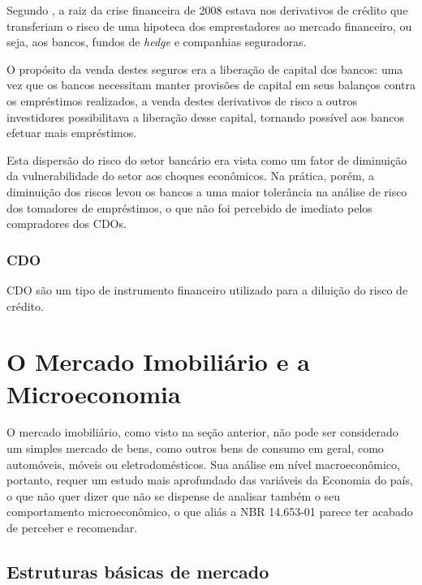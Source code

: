 \documentclass[
	12pt,				%
	oneside,			%
	a4paper,			%
	chapter=TITLE,		%
	section=TITLE,		%
	english,			%
	brazil				%
	]{abntex2}
\begin{document}
Segundo \textcite{devil}, a raiz da crise financeira de 2008 estava nos
derivativos de crédito que transferiam o risco de uma hipoteca dos
emprestadores ao mercado financeiro, ou seja, aos bancos, fundos de
\emph{hedge} e companhias seguradoras.

O propósito da venda destes seguros era a liberação de capital dos
bancos: uma vez que os bancos necessitam manter provisões de capital em
seus balanços contra os empréstimos realizados, a venda destes
derivativos de risco a outros investidores possibilitava a liberação
desse capital, tornando possível aos bancos efetuar mais empréstimos.

Esta dispersão do risco do setor bancário era vista como um fator de
diminuição da vulnerabilidade do setor aos choques econômicos. Na
prática, porém, a diminuição dos riscos levou os bancos a uma maior
tolerância na análise de risco dos tomadores de empréstimos, o que não
foi percebido de imediato pelos compradores dos \gls{CDO}s.

\subsubsection{\texorpdfstring{\gls{CDO}}{}}\label{section}

\gls{CDO} são um tipo de instrumento financeiro utilizado para a
diluição do risco de crédito.

\section{O Mercado Imobiliário e a Microeconomia}\label{micro}

O mercado imobiliário, como visto na seção anterior, não pode ser
considerado um simples mercado de bens, como outros bens de consumo em
geral, como automóveis, móveis ou eletrodomésticos. Sua análise em nível
macroeconômico, portanto, requer um estudo mais aprofundado das
variáveis da Economia do país, o que não quer dizer que não se dispense
de analisar também o seu comportamento microeconômico, o que aliás a NBR
14.653-01 \autocite*{NBR1465301} parece ter acabado de perceber e
recomendar.

\subsection{Estruturas básicas de
mercado}\label{estruturas-buxe1sicas-de-mercado}
\end{document}
